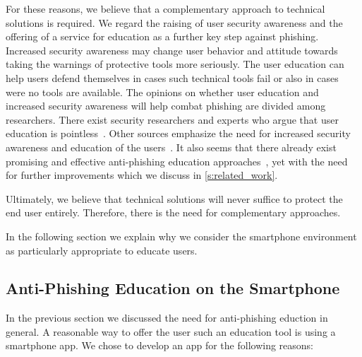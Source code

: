For these reasons, we believe that a complementary approach to technical solutions is required.
We regard the raising of user security awareness and the offering of a service for education as a further key step against phishing.
Increased security awareness may change user behavior and attitude towards taking the warnings of protective tools more seriously.
The user education can help users defend themselves in cases such technical tools fail or also in cases were no tools are available.
The opinions on whether user education and increased security awareness will help combat phishing are divided among researchers.
There exist security researchers and experts who argue that user education is pointless~\cite{useredupointless, bruceschneieronsecuritytraining}.
Other sources emphasize the need for increased security awareness and education of the users~\cite{usereducebit, usereduscmagazine}.
It also seems that there already exist promising and effective anti-phishing education approaches~\cite{kumaraguru2007protecting, sheng2007antiphishingphil}, yet with the need for further improvements which we discuss in \autoref{s:related_work}.

Ultimately, we believe that technical solutions will never suffice to protect the end user entirely.
Therefore, there is the need for complementary approaches.

In the following section we explain why we consider the smartphone environment as particularly appropriate to educate users.

\subsection{Anti-Phishing Education on the Smartphone}
\label{s:antiphishing_on_smartphone}
In the previous section we discussed the need for anti-phishing eduction in general. A reasonable way to offer the user such an education tool is using a smartphone app.
We chose to develop an app for the following reasons:

